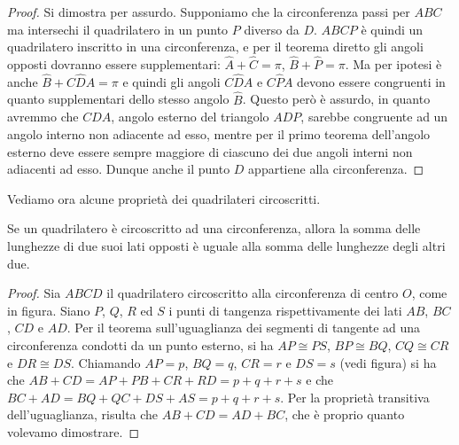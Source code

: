 \begin{proof}
Si dimostra per assurdo. Supponiamo che la circonferenza passi per 
\(ABC\) ma intersechi il quadrilatero in un punto \(P\) diverso da \(D\). 
\(ABCP\) è quindi un quadrilatero inscritto in una circonferenza, e per 
il teorema diretto gli angoli opposti dovranno essere supplementari: 
\(\widehat{A}+\widehat{C}=\pi\), \(\widehat{B}+\widehat{P}=\pi\). Ma per 
ipotesi è anche \(\widehat{B}+C\widehat{D}A=\pi\) e quindi gli angoli 
\(C\widehat{D}A\) e \(C\widehat{P}A\) devono essere congruenti in quanto 
supplementari dello stesso angolo \(\widehat{B}\). Questo però è 
assurdo, in quanto avremmo che \(C\widehat{D}A\), angolo esterno del 
triangolo \(ADP\), sarebbe congruente ad un angolo interno non 
adiacente ad esso, mentre per il primo teorema dell'angolo esterno 
deve essere sempre maggiore di ciascuno dei due angoli interni non 
adiacenti ad esso. Dunque anche il punto \(D\) appartiene alla 
circonferenza.
\end{proof}

Vediamo ora alcune proprietà dei quadrilateri circoscritti.

\begin{teorema}\label{teo:6.6}
Se un quadrilatero è circoscritto ad una circonferenza, allora la 
somma delle lunghezze di due suoi lati opposti è uguale alla somma 
delle lunghezze degli altri due.
\end{teorema}


\begin{inaccessibleblock}
 \begin{figure}[htb]
	\centering
\end{figure}
\end{inaccessibleblock}

\begin{proof}
Sia \(ABCD\) il quadrilatero circoscritto alla circonferenza di centro 
\(O\), come in figura. Siano \(P\), \(Q\), \(R\) ed \(S\) i punti di tangenza 
rispettivamente dei lati \(AB\), \(BC\), \(CD\) e \(AD\). Per il teorema 
sull'uguaglianza dei segmenti di tangente ad una circonferenza 
condotti da un punto esterno, si ha \(AP\cong PS\), \(BP\cong BQ\), 
\(CQ\cong CR\) e \(DR\cong DS\). Chiamando \(AP=p\), \(BQ=q\), \(CR=r\) e 
\(DS=s\) (vedi figura) si ha che \(AB+CD = AP+PB+CR+RD = p+q+r+s\) e che 
\(BC+AD = BQ+QC+DS+AS = p+q+r+s\).
Per la proprietà transitiva dell'uguaglianza, risulta che 
\(AB+CD=AD+BC\), che è proprio quanto volevamo dimostrare.
\end{proof}

